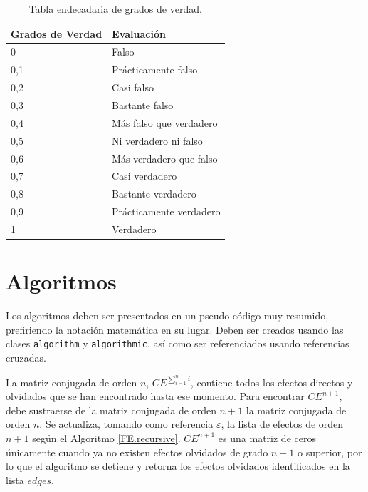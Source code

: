 \begin{table}
\centering
\begin{tabular}{|l|l|}
\hline
\textbf{Grados de Verdad} & \textbf{Evaluación}     \\ \hline
0                         & Falso                   \\ \hline
0,1                       & Prácticamente falso     \\ \hline
0,2                       & Casi falso              \\ \hline
0,3                       & Bastante falso          \\ \hline
0,4                       & Más falso que verdadero \\ \hline
0,5                       & Ni verdadero ni falso   \\ \hline
0,6                       & Más verdadero que falso \\ \hline
0,7                       & Casi verdadero          \\ \hline
0,8                       & Bastante verdadero      \\ \hline
0,9                       & Prácticamente verdadero \\ \hline
1                         & Verdadero               \\ \hline
\end{tabular}
\caption{Tabla endecadaria de grados de verdad.}
\label{tab:Tabla-de-Verdad}
\end{table}

\section{Algoritmos}
Los algoritmos deben ser presentados en un pseudo-código muy resumido, prefiriendo la notación matemática en su lugar. Deben ser creados usando las clases \texttt{algorithm} y \texttt{algorithmic}, así como ser referenciados usando referencias cruzadas.

La matriz conjugada de orden $n$, $CE^{\sum_{i=1}^{n}{i}}$, contiene todos los efectos directos y olvidados que se han encontrado hasta ese momento. Para encontrar $CE^{n+1}$, debe sustraerse de la matriz conjugada de orden $n+1$ la matriz conjugada de orden $n$. Se actualiza, tomando como referencia $\varepsilon$, la lista de efectos de orden $n+1$ según el Algoritmo \ref{FE.recursive}. $CE^{n+1}$ es una matriz de ceros únicamente cuando ya no existen efectos olvidados de grado $n+1$ o superior, por lo que el algoritmo se detiene y retorna los efectos olvidados identificados en la lista $edges$.

